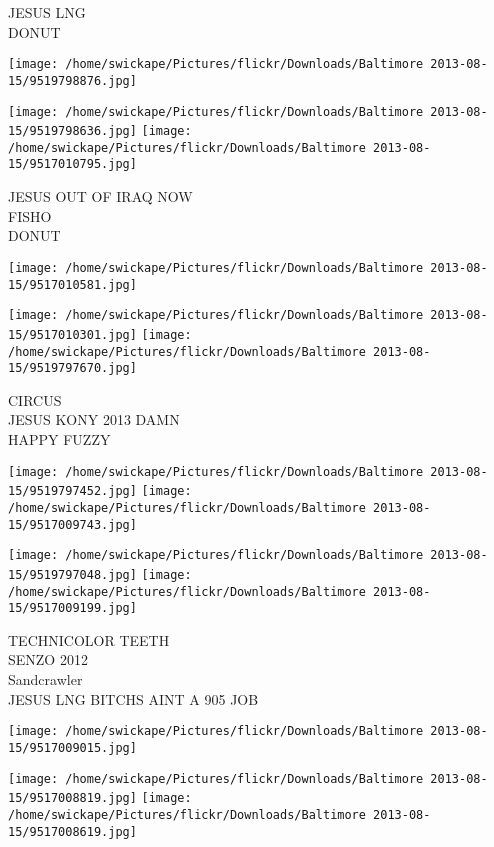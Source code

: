 \documentclass[10pt,letterpaper]{article}
\begin{document}
JESUS LNG\\
DONUT\\
\pagebreak

\texttt{[image: /home/swickape/Pictures/flickr/Downloads/Baltimore 2013-08-15/9519798876.jpg]}

\vspace{0.25in}
\texttt{[image: /home/swickape/Pictures/flickr/Downloads/Baltimore 2013-08-15/9519798636.jpg]}
\texttt{[image: /home/swickape/Pictures/flickr/Downloads/Baltimore 2013-08-15/9517010795.jpg]}

JESUS OUT OF IRAQ NOW\\
FISHO\\
DONUT\\
\pagebreak

\texttt{[image: /home/swickape/Pictures/flickr/Downloads/Baltimore 2013-08-15/9517010581.jpg]}

\vspace{0.25in}
\texttt{[image: /home/swickape/Pictures/flickr/Downloads/Baltimore 2013-08-15/9517010301.jpg]}
\texttt{[image: /home/swickape/Pictures/flickr/Downloads/Baltimore 2013-08-15/9519797670.jpg]}

CIRCUS\\
JESUS KONY 2013 DAMN\\
HAPPY FUZZY\\
\pagebreak

\texttt{[image: /home/swickape/Pictures/flickr/Downloads/Baltimore 2013-08-15/9519797452.jpg]}
\texttt{[image: /home/swickape/Pictures/flickr/Downloads/Baltimore 2013-08-15/9517009743.jpg]}

\texttt{[image: /home/swickape/Pictures/flickr/Downloads/Baltimore 2013-08-15/9519797048.jpg]}
\texttt{[image: /home/swickape/Pictures/flickr/Downloads/Baltimore 2013-08-15/9517009199.jpg]}

TECHNICOLOR TEETH\\
SENZO 2012\\
Sandcrawler\\
JESUS LNG BITCHS AINT A 905 JOB\\
\pagebreak

\texttt{[image: /home/swickape/Pictures/flickr/Downloads/Baltimore 2013-08-15/9517009015.jpg]}

\vspace{0.25in}
\texttt{[image: /home/swickape/Pictures/flickr/Downloads/Baltimore 2013-08-15/9517008819.jpg]}
\texttt{[image: /home/swickape/Pictures/flickr/Downloads/Baltimore 2013-08-15/9517008619.jpg]}
\end{document}
